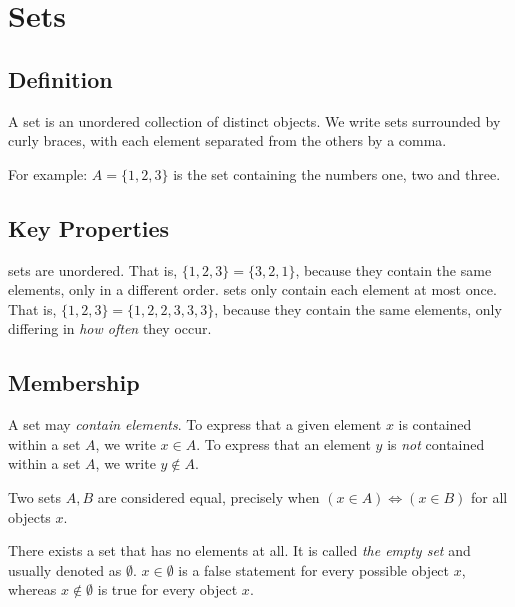 \chapter{Sets}\label{ch:sets}
\section{Definition}
\begin{definition}
  A set is an unordered collection of distinct objects.
  We write sets surrounded by curly braces, with each element
  separated from the others by a comma.
\end{definition}
\begin{example}
  [A set]
  For example: \(A = \{1, 2, 3\}\) is the set
  containing the numbers one, two and three.
\end{example}

\section{Key Properties}
\begin{itemize}
   sets are unordered. That is, \(\{1,2,3\}=\{3,2,1\}\),
  because they contain the same elements, only in a different order.
   sets only contain each element at most once.
  That is, \(\{1,2,3\}=\{1,2,2,3,3,3\}\), because they contain the same
  elements, only differing in \emph{how often} they occur.
\end{itemize}

\section{Membership}
A set may \emph{contain elements}.
To express that a given element \(x\) is contained within a set \(A\),
we write \(x \in A\). To express that an element \(y\) is \emph{not} contained
within a set \(A\), we write \(y \notin A\).

Two sets \(A, B\) are considered equal, precisely when
\((x \in A) \Leftrightarrow (x \in B)\) for all objects \(x\).

There exists a set that has no elements at all. It is called \emph{the empty
  set} and usually denoted as \(\emptyset\).
\(x \in \emptyset\) is a false statement for every possible object \(x\),
whereas \(x \notin \emptyset\) is true for every object \(x\).


